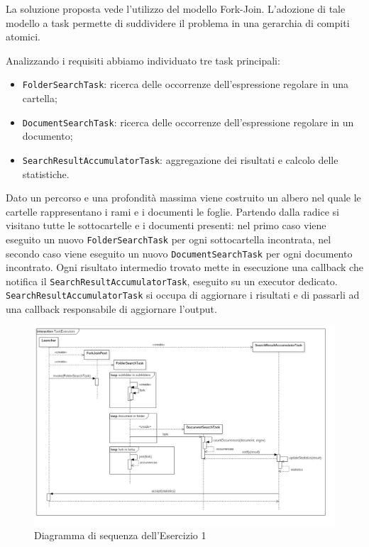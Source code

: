 ﻿\documentclass[a4paper]{article}
\begin{document}
La soluzione proposta vede l'utilizzo del modello Fork-Join.
%
L'adozione di tale modello a task permette di suddividere il problema in una gerarchia di compiti atomici.

Analizzando i requisiti abbiamo individuato tre task principali:

\begin{itemize}
%
    \item \texttt{FolderSearchTask}: ricerca delle occorrenze dell'espressione regolare in una cartella;
%
    \item \texttt{DocumentSearchTask}: ricerca delle occorrenze dell'espressione regolare in un documento;
%
    \item \texttt{SearchResultAccumulatorTask}: aggregazione dei risultati e calcolo delle statistiche.
%
\end{itemize}

Dato un percorso e una profondit\`a massima viene costruito un albero nel quale le cartelle rappresentano i rami e i documenti le foglie.
%
Partendo dalla radice si visitano tutte le sottocartelle e i documenti presenti: nel primo caso viene eseguito un nuovo \texttt{FolderSearchTask} per ogni sottocartella incontrata, nel secondo caso viene eseguito un nuovo \texttt{DocumentSearchTask} per ogni documento incontrato.
%
Ogni risultato intermedio trovato mette in esecuzione una callback che notifica il \texttt{SearchResultAccumulatorTask}, eseguito su un executor dedicato.
\texttt{SearchResultAccumulatorTask} si occupa di aggiornare i risultati e di passarli ad una callback responsabile di aggiornare l'output.
%
\begin{figure}[H]

    \centering

    \includegraphics[width=\linewidth, height=\textheight,keepaspectratio]{TaskExecutors}

    \caption{Diagramma di sequenza dell'Esercizio 1}

    \label{fig:task-executors}

\end{figure}
\newpage
\end{document}
